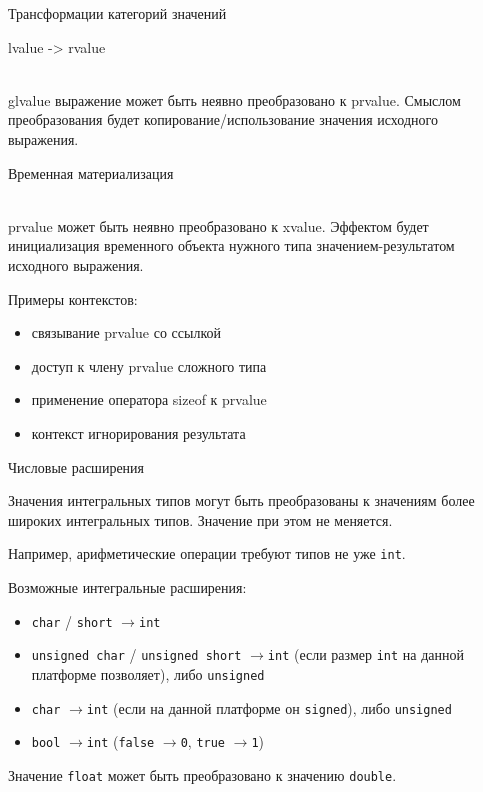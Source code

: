 \documentclass[unknownkeysallowed,xcolor=table]{beamer}
\newcommand{\rarr}{$\rightarrow$}
\begin{document}
\begin{frame}{Трансформации категорий значений}

\begin{large}lvalue -> rvalue\end{large} \\ \vspace{0.5em}
glvalue выражение может быть неявно преобразовано к prvalue. Смыслом преобразования будет копирование/использование значения исходного выражения.
\vspace{1em}

\begin{large}Временная материализация\end{large} \\ \vspace{0.5em}
prvalue может быть неявно преобразовано к xvalue. Эффектом будет инициализация временного объекта нужного типа значением-результатом исходного выражения.
\vspace{0.5em}

Примеры контекстов:
\begin{itemize}
  \setlength{\itemindent}{4em}
  \item связывание prvalue со ссылкой
  \item доступ к члену prvalue сложного типа
  \item применение оператора sizeof к prvalue
  \item контекст игнорирования результата
\end{itemize}

\end{frame}

\begin{frame}{Числовые расширения}

Значения интегральных типов могут быть преобразованы к значениям более широких интегральных типов. Значение при этом не меняется.

Например, арифметические операции требуют типов не уже \lstinline{int}.

Возможные интегральные расширения:

\begin{itemize}
  \item \lstinline{char} / \lstinline{short} \rarr \lstinline{int}
  \item \lstinline{unsigned char} / \lstinline{unsigned short} \rarr \lstinline{int} (если размер \lstinline{int} на данной платформе позволяет), либо \lstinline{unsigned}
  \item \lstinline{char} \rarr \lstinline{int} (если на данной платформе он \lstinline{signed}), либо \lstinline{unsigned}
  \item \lstinline{bool} \rarr \lstinline{int} (\lstinline{false} \rarr \lstinline{0}, \lstinline{true} \rarr \lstinline{1})
\end{itemize}

\vspace{0.5em}
Значение \lstinline{float} может быть преобразовано к значению \lstinline{double}.

\end{frame}
\end{document}
